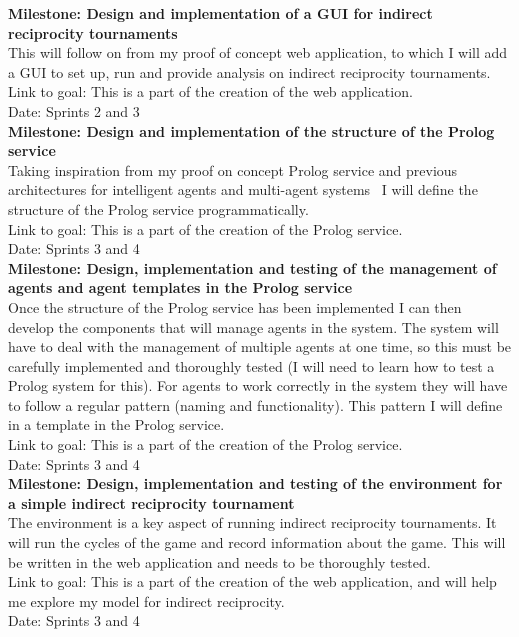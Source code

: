 \documentclass{article}
\begin{document}
\noindent\textbf{Milestone: Design and implementation of a GUI for indirect reciprocity tournaments}\\
This will follow on from my proof of concept web application, to which I will add a GUI to set up, run and provide analysis on indirect reciprocity tournaments.\\
Link to goal: This is a part of the creation of the web application.\\
Date: Sprints 2 and 3\\

\noindent\textbf{Milestone: Design and implementation of the structure of the Prolog service}\\
Taking inspiration from my proof on concept Prolog service and previous architectures for intelligent agents and multi-agent systems~\cite{prosocs} I will define the structure of the Prolog service programmatically.\\
Link to goal: This is a part of the creation of the Prolog service.\\
Date: Sprints 3 and 4\\

\noindent\textbf{Milestone: Design, implementation and testing of the management of agents and agent templates in the Prolog service}\\
Once the structure of the Prolog service has been implemented I can then develop the components that will manage agents in the system. The system will have to deal with the management of multiple agents at one time, so this must be carefully implemented and thoroughly tested (I will need to learn how to test a Prolog system for this). For agents to work correctly in the system they will have to follow a regular pattern (naming and functionality). This pattern I will define in a template in the Prolog service.\\
Link to goal: This is a part of the creation of the Prolog service.\\
Date: Sprints 3 and 4\\

\noindent\textbf{Milestone: Design, implementation and testing of the environment for a simple indirect reciprocity tournament}\\
The environment is a key aspect of running indirect reciprocity tournaments. It will run the cycles of the game and record information about the game. This will be written in the web application and needs to be thoroughly tested.\\
Link to goal: This is a part of the creation of the web application, and will help me explore my model for indirect reciprocity.\\
Date: Sprints 3 and 4\\
\end{document}
